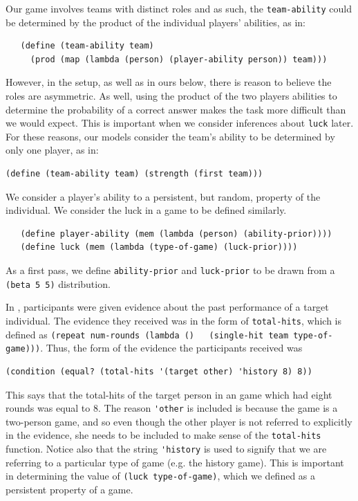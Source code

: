 \documentclass{article}
\begin{document}
Our game involves teams with distinct roles and as such, the \lstinline{team-ability} could be determined by the product of the individual players' abilities, as in:

\begin{lstlisting}
   (define (team-ability team)
     (prod (map (lambda (person) (player-ability person)) team)))
\end{lstlisting}

However, in the \citet{Klein1992} setup, as well as in ours below, there is reason to believe the roles are asymmetric. As well, using the product of the two players abilities to determine the probability of a correct answer makes the task more difficult than we would expect. This is important when we consider inferences about \lstinline{luck} later. For these reasons, our models consider the team's ability to be determined by only one player, as in:

\begin{lstlisting}
(define (team-ability team) (strength (first team)))
\end{lstlisting}

We consider a player's ability to a persistent, but random, property of the individual. We consider the luck in a game to be defined similarly. 

\begin{lstlisting}
   (define player-ability (mem (lambda (person) (ability-prior))))
   (define luck (mem (lambda (type-of-game) (luck-prior))))
\end{lstlisting}

As a first pass, we define \lstinline{ability-prior} and \lstinline{luck-prior} to be drawn from a \lstinline{(beta 5 5)} distribution. 

In \citet{Klein1992}, participants were given evidence about the past performance of a target individual. The evidence they received was in the form of \lstinline{total-hits}, which is defined as \lstinline{(repeat num-rounds (lambda ()   (single-hit team type-of-game)))}. Thus, the form of the evidence the participants received was 

\begin{lstlisting}
(condition (equal? (total-hits '(target other) 'history 8) 8))
\end{lstlisting}

This says that the total-hits of the target person in an game which had eight rounds was equal to 8. The reason \lstinline{'other} is included is because the game is a two-person game, and so even though the other player is not referred to explicitly in the evidence, she needs to be included to make sense of the \lstinline{total-hits} function. Notice also that the string \lstinline{'history} is used to signify that we are referring to a particular type of game (e.g. the history game). This is important in determining the value of \lstinline{(luck type-of-game)}, which we defined as a persistent property of a game.
\end{document}
